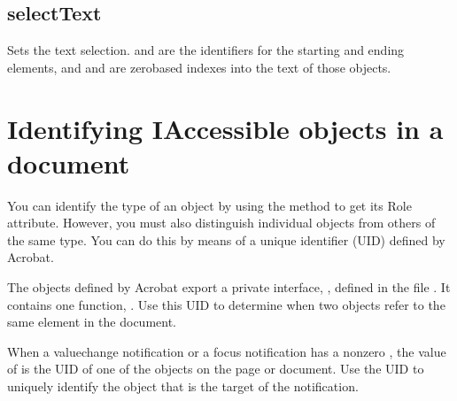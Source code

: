 \documentclass[letterpaper,12pt,english,openany,oneside]{sphinxmanual}
\begin{document}
\subsection{selectText}
\label{\detokenize{MSAA_PDF:selecttext}}
Sets the text selection.  and  are the  identifiers for the starting and ending  elements, and  and  are zero\sphinxhyphen{}based indexes into the text of those  objects.

\begin{sphinxVerbatim}[commandchars=\\\{\}]
 
 
 
 
 
\end{sphinxVerbatim}




\section{Identifying IAccessible objects in a document}
\label{\detokenize{MSAA_PDF:identifying-iaccessible-objects-in-a-document}}
You can identify the type of an  object by using the  method to get its Role attribute. However, you must also distinguish individual objects from others of the same type. You can do this by means of a unique identifier (UID) defined by Acrobat.

The  objects defined by Acrobat export a private interface,  , defined in the file  . It contains one function,  . Use this UID to determine when two  objects refer to the same element in the document.

When a value\sphinxhyphen{}change notification or a focus notification has a non\sphinxhyphen{}zero  , the value of  is the UID of one of the objects on the page or document. Use the UID to uniquely identify the object that is the target of the notification.
\end{document}

